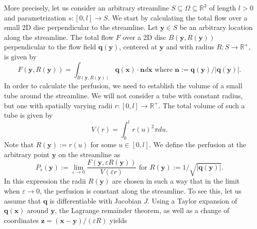 \documentclass[10pt]{article}
\begin{document}
	More precisely, let us consider an arbitrary streamline $S \subseteq \Omega \subseteq \mathbb{R}^3$ of length $l>0$ and parametrization $s:[0,l] \to S$.
	We start by calculating the total flow over a small 2D disc perpendicular to the streamline.
	Let $\mathbf{y} \in S$ be an arbitrary location along the streamline. 
	The total flow $F$ over a 2D disc $B(\mathbf{y},R(\mathbf{y}))$ perpendicular to the flow field $\mathbf{q}(\mathbf{y})$, centered at $\mathbf{y}$ and with radius $R:S\to\mathbb{R}^+$, is given by
	\begin{equation}
		F(\mathbf{y},R(\mathbf{y})) = \int_{B(\mathbf{y},R(\mathbf{y}))} \mathbf{q}(\mathbf{x}) \cdot \mathbf{n} d \mathbf{x} \text{ where }\mathbf{n} := \mathbf{q}(\mathbf{y})/\vert \mathbf{q}(\mathbf{y}) \vert.
		\label{eq:Fdisc}
	\end{equation}
	In order to calculate the perfusion, we need to establish the volume of a small tube around the streamline.
	We will not consider a tube with constant radius, but one with spatially varying radii $r:[0,l] \to \mathbb{R}^+$.
	The total volume of such a tube is given by
	\begin{equation}
		V(r) = \int_0^l r(u)^2 \pi d u.
	\end{equation}
        Note that $R(\mathbf{y}):=r(u)$ for some $u \in [0,l]$.
        We define the perfusion at the arbitrary point $\mathbf{y}$ on the streamline as
	\begin{equation}
		P_s(\mathbf{y}):=  \lim_{\varepsilon \to 0} \frac{F(\mathbf{y},\varepsilon R(\mathbf{y}))}{V(\varepsilon r)} \text{ for } R(\mathbf{y}):=1/\sqrt{\vert \mathbf{q}(\mathbf{y}) \vert}.
		\label{eq:perfusiondef}
	\end{equation}
	In this expression the radii $R(\mathbf{y})$ are chosen in such a way that in the limit when $\varepsilon \to 0$, the perfusion is constant along the streamline. 
	To see this, let us assume that $\mathbf{q}$ is differentiable with Jacobian $J$.
	Using a Taylor expansion of $\mathbf{q}(\mathbf{x})$ around $\mathbf{y}$, the Lagrange remainder theorem, as well as a change of coordinates $\mathbf{z} = (\mathbf{x}-\mathbf{y})/(\varepsilon R)$ yields 
\end{document}
